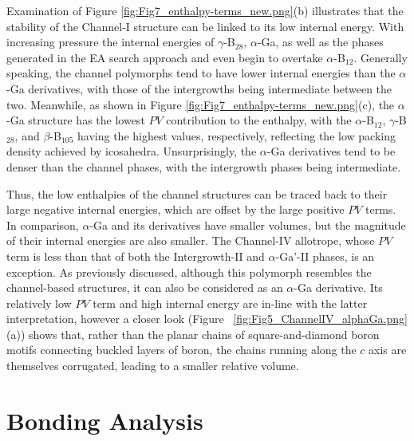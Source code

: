 \documentclass[reprint,aps,prl,twocolumn,letterpaper]{revtex4-2}
\begin{document}
Examination of Figure \ref{fig:Fig7_enthalpy-terms_new.png}(b) illustrates that the stability of the Channel-I structure can be linked to its low internal energy. With increasing pressure the internal energies of  $\gamma$-B$_{28}$, $\alpha$-Ga, as well as the phases generated in the EA search approach and even begin to overtake  $\alpha$-B$_{12}$. Generally speaking, the channel polymorphs tend to have lower internal energies than the $\alpha$-Ga derivatives, with those of the intergrowths being intermediate between the two. Meanwhile, as shown in Figure \ref{fig:Fig7_enthalpy-terms_new.png}(c), the $\alpha$-Ga structure has the lowest $PV$ contribution to the enthalpy, with the $\alpha$-B$_{12}$, $\gamma$-B$_{28}$, and $\beta$-B$_{105}$ having the highest values, respectively, reflecting the low packing density achieved by icosahedra. Unsurprisingly, the $\alpha$-Ga derivatives tend to be denser than the channel phases, with the intergrowth phases being intermediate.

Thus, the low enthalpies of the channel structures can be traced back to their large negative internal energies, which are offset by the large positive $PV$ terms. In comparison, $\alpha$-Ga and its derivatives have smaller volumes, but the magnitude of their internal energies are also smaller. The Channel-IV allotrope, whose $PV$ term is less than that of both the Intergrowth-II and $\alpha$-Ga'-II phases, is an exception. As previously discussed, although this polymorph resembles the channel-based structures, it can also be considered as an $\alpha$-Ga derivative. Its relatively low $PV$ term and high internal energy are in-line with the latter interpretation, however a closer look (Figure ~\ref{fig:Fig5_ChannelIV_alphaGa.png}(a)) shows that,  rather than the planar chains of square-and-diamond boron motifs connecting buckled layers of boron, the chains running along the $c$ axis are themselves corrugated, leading to a smaller relative volume.     



\section{Bonding Analysis} 
\end{document}
